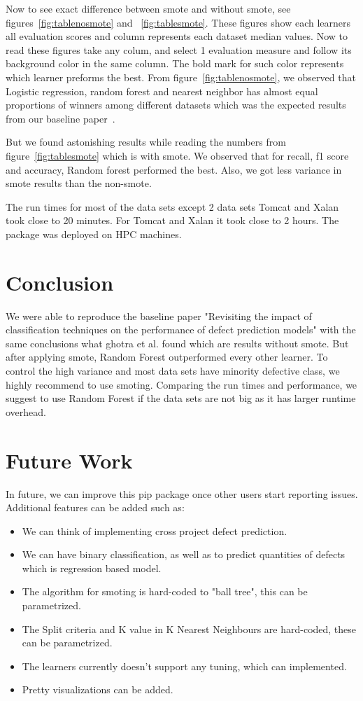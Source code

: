 \documentclass[conference]{IEEEtran}
\begin{document}
 Now to see exact difference between smote and without smote, see figures~\ref{fig:tablenosmote} and ~\ref{fig:tablesmote}. These figures show each learners all evaluation scores and column represents each dataset median values. Now to read these figures take any colum, and select 1 evaluation measure and follow its background color in the same column. The bold mark for such color represents which learner preforms the best. From figure~\ref{fig:tablenosmote}, we observed that Logistic regression, random forest and nearest neighbor has almost equal proportions of winners among different datasets which was the expected results from our baseline paper~\cite{ghotra2015revisiting}. 
 
 But we found astonishing results while reading the numbers from figure~\ref{fig:tablesmote} which is with smote. We observed that for recall, f1 score and accuracy, Random forest performed the best. Also, we got less variance in smote results than the non-smote.

The run times for most of the data sets except 2 data sets Tomcat and Xalan took close to 20 minutes. For Tomcat and Xalan it took close to 2 hours. The package was deployed on HPC machines.

\section{Conclusion}
\label{conclusion}

We were able to reproduce the baseline paper "Revisiting the impact of classification techniques on the performance of defect prediction models" with the same conclusions what ghotra et al. found which are results without smote. But after applying smote, Random Forest outperformed every other learner. To control the high variance and most data sets have minority defective class, we highly recommend to use smoting. Comparing the run times and performance, we suggest to use Random Forest if the data sets are not big as it has larger runtime overhead.

\section{Future Work}
\label{future}
In future, we can improve this pip package once other users start reporting issues. Additional features can be added such as:
\begin{itemize}
 \item We can think of implementing cross project defect prediction.
 \item We can have binary classification, as well as to predict quantities of defects which is regression based model.
 \item The algorithm for smoting is hard-coded to "ball tree", this can be parametrized.
 \item The Split criteria and K value in K Nearest Neighbours are hard-coded, these can be parametrized.
 \item The learners currently doesn't support any tuning, which can implemented.
 \item Pretty visualizations can be added.
\end{itemize}

\balance


\medskip

\end{document}
